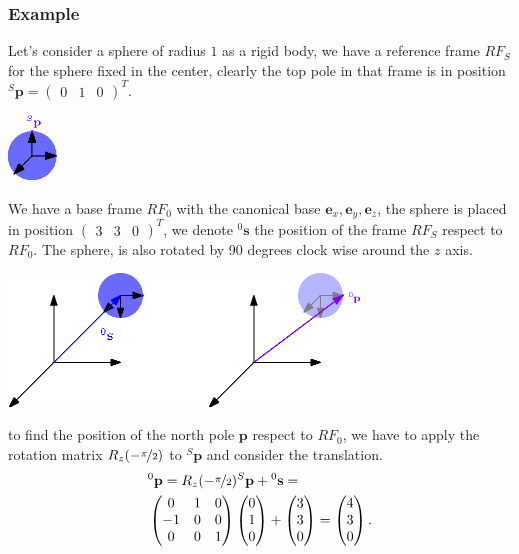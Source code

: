 \documentclass[10pt, letterpaper]{report}
\begin{document}
\subsubsection{Example}
Let's consider a sphere of radius $1$ as a rigid body, we have a reference frame $RF_S$ for the sphere fixed in the center, clearly the top pole in that frame is in position ${}^S\mathbf p=\begin{pmatrix}
    0&1&0
\end{pmatrix}^T$.\begin{center}
    \includegraphics[width=0.1\textwidth ]{images/sphere.eps}
\end{center}
We have a base frame $RF_0$ with the canonical base
$\mathbf e_x,\mathbf e_y,\mathbf e_z$, the sphere is placed in position $\begin{pmatrix}
    3&3&0
\end{pmatrix}^T$, we denote ${}^0\mathbf s$ the position of the frame $RF_S$ respect to $RF_0$. The sphere, is also rotated by 90 degrees clock wise around the $z$ axis.\begin{center}
    \includegraphics[width=0.7\textwidth ]{images/sphere_2.eps}
\end{center}
to find the position of the north pole $\mathbf p$ respect to $RF_0$, we have to apply the rotation matrix $R_z(-\nicefrac{\pi}{2})$ to ${}^S\mathbf p$ and consider the translation.
\begin{align}
    &{}^0\mathbf p=R_z(-\nicefrac{\pi}{2}){}^S\mathbf p+{}^0\mathbf s=\\
&\begin{pmatrix}
        0 & 1&0\\
        -1&0&0\\
        0&0&1
    \end{pmatrix} \begin{pmatrix}
    0\\1\\0
\end{pmatrix}+\begin{pmatrix}
    3\\3\\0
\end{pmatrix}=\begin{pmatrix}
    4\\3\\0
\end{pmatrix}.
\end{align}
\end{document}

